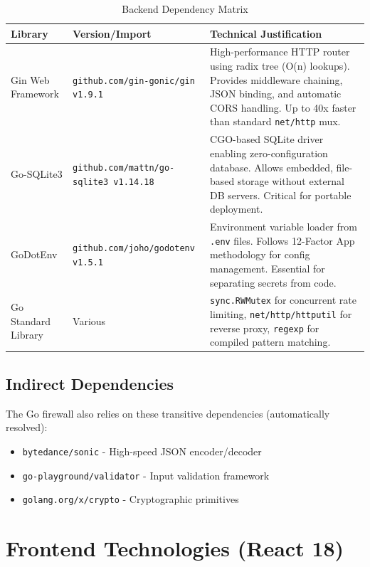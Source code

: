 \documentclass[11pt,a4paper]{report}
\begin{document}
\begin{table}[H]
\centering
\begin{tabular}{@{}lp{4cm}p{7cm}@{}}
\toprule
\textbf{Library} & \textbf{Version/Import} & \textbf{Technical Justification} \\ \midrule
Gin Web Framework & \texttt{github.com/gin-gonic/gin v1.9.1} & High-performance HTTP router using radix tree (O(n) lookups). Provides middleware chaining, JSON binding, and automatic CORS handling. Up to 40x faster than standard \texttt{net/http} mux. \\ \midrule
Go-SQLite3 & \texttt{github.com/mattn/go-sqlite3 v1.14.18} & CGO-based SQLite driver enabling zero-configuration database. Allows embedded, file-based storage without external DB servers. Critical for portable deployment. \\ \midrule
GoDotEnv & \texttt{github.com/joho/godotenv v1.5.1} & Environment variable loader from \texttt{.env} files. Follows 12-Factor App methodology for config management. Essential for separating secrets from code. \\ \midrule
Go Standard Library & Various & \texttt{sync.RWMutex} for concurrent rate limiting, \texttt{net/http/httputil} for reverse proxy, \texttt{regexp} for compiled pattern matching. \\ \bottomrule
\end{tabular}
\caption{Backend Dependency Matrix}
\end{table}

\subsection{Indirect Dependencies}
The Go firewall also relies on these transitive dependencies (automatically resolved):
\begin{itemize}
    \item \texttt{bytedance/sonic} - High-speed JSON encoder/decoder
    \item \texttt{go-playground/validator} - Input validation framework
    \item \texttt{golang.org/x/crypto} - Cryptographic primitives
\end{itemize}

\section{Frontend Technologies (React 18)}
\end{document}
